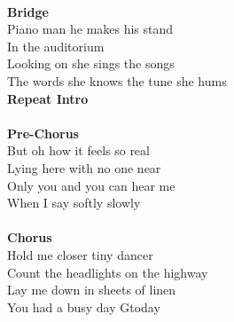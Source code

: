 \\
\textbf{Bridge}\\
Piano man he makes his stand\\
In the auditorium     \\
Looking on   she sings the songs\\
The words she knows the tune she hums         \\
\textbf{Repeat Intro}\\
\\
\textbf{Pre-Chorus}\\
But oh how it feels so real\\
Lying here with no one near\\
Only you and you can hear me\\
When I say softly slowly\\
\\
\textbf{Chorus}\\
Hold me closer tiny dancer      \\
Count the headlights on the highway       \\
Lay me down in sheets of linen       \\
You had a busy day Gtoday      \\

